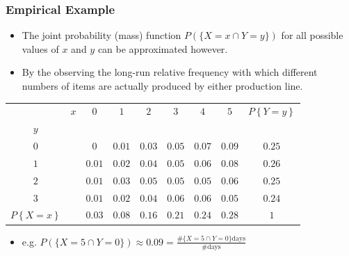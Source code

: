 \documentclass[notes=show,handout]{beamer}\usepackage[]{graphicx}\usepackage[]{color}
\newenvironment{stepitemize}{\begin{itemize}[<+->]}{\end{itemize} }
\renewcommand{\Pr}{P}
\begin{document}
\begin{frame}%

\frametitle{Empirical Example}

\begin{example}

\begin{stepitemize}
\item The joint probability (mass) function $\Pr(\{X=x\cap Y=y\})$ for all
possible values of $x$ and $y$ can be approximated however.

\item By the observing the long-run relative frequency with which different
numbers of items are actually produced by either production line.
\end{stepitemize}

\begin{tabular}{|cc||c|c|c|c|c|c||c|}
\hline
& $x$ & $0$ & $1$ & $2$ & $3$ & $4$ & $5$ & $\Pr \left\{ Y=y\right\} $ \\
$y$ &  &  &  &  &  &  &  &  \\ \hline\hline
$0$ &  & $0$ & $0.01$ & $0.03$ & $0.05$ & $0.07$ & $0.09$ & $0.25$ \\ \hline
$1$ &  & $0.01$ & $0.02$ & $0.04$ & $0.05$ & $0.06$ & $0.08$ & $0.26$ \\
\hline
$2$ &  & $0.01$ & $0.03$ & $0.05$ & $0.05$ & $0.05$ & $0.06$ & $0.25$ \\
\hline
$3$ &  & $0.01$ & $0.02$ & $0.04$ & $0.06$ & $0.06$ & $0.05$ & $0.24$ \\
\hline\hline
$\Pr \left\{ X=x\right\} $ &  & $0.03$ & $0.08$ & $0.16$ & $0.21$ & $0.24$ &
$0.28$ & $1$ \\ \hline
\end{tabular}

\begin{stepitemize}

\item e.g. $\Pr(\{X=5\cap Y=0\})\approx 0.09=\frac{\#\{X=5\cap Y=0\}\text{days}%
}{\#\text{days}}$
\end{stepitemize}
\end{example}

\end{frame}%
\end{document}
